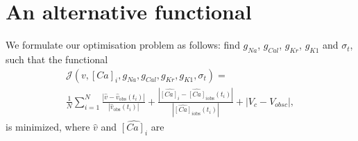\documentclass[12pt,a4paper]{article}
\begin{document}
%
%
\section{An alternative functional}
We formulate our optimisation problem as follows: find $g_{Na}$, $g_{Cal}$, $g_{Kr}$, $g_{K1}$ and $\sigma_t$, such that the functional
\begin{eqnarray} \nonumber
\mathcal{J}(v, [Ca]_i, g_{Na}, g_{Cal}, g_{Kr}, g_{K1}, \sigma_t)= \\
\frac{1}{N} \sum_{i=1}^{N} \frac{|\hat{v}-\hat{v}_{\text{obs}}(t_i)|}{|\hat{v}_{\text{obs}}(t_i)|} + \frac{|\hat{[Ca]_i}-\hat{[Ca]}_{i\text{obs}}(t_i)|}{|\hat{[Ca]}_{i\text{obs}}(t_i) |} + |V_c-V_{obs c}|,\label{J2}
\end{eqnarray}
is minimized, where $\hat{v}$ and $\hat{[Ca]_i}$ are
\end{document}
